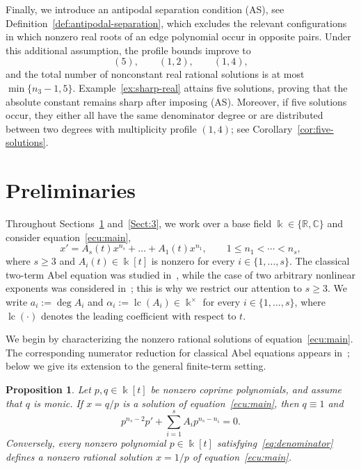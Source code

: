 \documentclass[12pt,a4paper]{amsart}
\numberwithin{theorem}{section}
\newtheorem{proposition}[theorem]{Proposition}
\theoremstyle{definition}
\begin{document}
	Finally, we introduce an antipodal separation condition {\rm (AS)}, see Definition~\ref{def:antipodal-separation}, which excludes the relevant configurations in which nonzero real roots of an edge polynomial occur in opposite pairs. Under this additional assumption, the profile bounds improve to
	\[
	(5),\qquad (1,2),\qquad (1,4),
	\]
	and the total number of nonconstant real rational solutions is at most $\min\{n_3-1,5\}$. Example~\ref{ex:sharp-real} attains five solutions, proving that the absolute constant remains sharp after imposing {\rm (AS)}. Moreover, if five solutions occur, they either all have the same denominator degree or are distributed between two degrees with multiplicity profile $(1,4)$; see Corollary~\ref{cor:five-solutions}.
	
	\section{Preliminaries}\label{Sect:2}
	
	Throughout Sections~\ref{Sect:2} and~\ref{Sect:3}, we work over a base field $\Bbbk\in\{\mathbb{R},\mathbb{C}\}$ and consider equation~\eqref{ecu:main}, 
	\[ 
	x'=A_s(t)x^{n_s}+\dots+A_1(t)x^{n_1},\qquad 1\leq n_1<\cdots<n_s, 
	\] 
	where $s\geq3$ and $A_i(t)\in\Bbbk[t]$ is nonzero for every $i\in\{1,\ldots,s\}$. The classical two-term Abel equation was studied in~\cite{BravoCalderonFernandezOjeda2022}, while the case of two arbitrary nonlinear exponents was considered in~\cite{DuZhao2026}; this is why we restrict our attention to $s\geq3$. We write $a_i:=\deg A_i$ and $\alpha_i:=\operatorname{lc}(A_i)\in\Bbbk^\times$ for every $i\in\{1,\ldots,s\}$, where $\operatorname{lc}(\cdot)$ denotes the leading coefficient with respect to $t$.
	
	We begin by characterizing the nonzero rational solutions of equation~\eqref{ecu:main}. The corresponding numerator reduction for classical Abel equations appears in~\cite{BravoCalderonFernandezOjeda2022}; below we give its extension to the general finite-term setting.
	
	\begin{proposition}\label{prop:condinv}
		Let $p,q\in\Bbbk[t]$ be nonzero coprime polynomials, and assume that $q$ is monic. If $x=q/p$ is a solution of equation~\eqref{ecu:main}, then $q\equiv1$ and
		\begin{equation}\label{eq:denominator}
			p^{n_s-2}p'+\sum_{i=1}^s A_i p^{n_s-n_i}=0.
		\end{equation}
		Conversely, every nonzero polynomial $p\in\Bbbk[t]$ satisfying~\eqref{eq:denominator} defines a nonzero rational solution $x=1/p$ of equation~\eqref{ecu:main}.
	\end{proposition}
	
\end{document}
